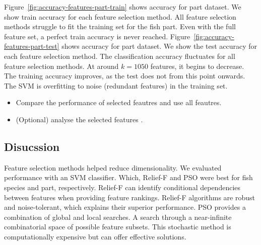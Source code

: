 \documentclass[runningheads]{llncs}
\begin{document}
Figure~\ref{fig:accuracy-features-part-train} shows accuracy for part dataset.
We show train accuracy for each feature selection method.
All feature selection methods struggle to fit the training set for the fish part.
Even with the full feature set, a perfect train accuracy is never reached.
Figure~\ref{fig:accuracy-features-part-test} shows accuracy for part dataset.
We show the test accuracy for each feature selection method.
The classification accuracy fluctuates for all feature selection methods.
At around $k=1050$ features, it begins to decrease.
The training accuracy improves, as the test does not from this point onwards.
The SVM is overfitting to noise (redundant features) in the training set.


\begin{itemize}
  \item Compare the performance of selected feautres and use all feautres. 
  \item (Optional) analyse the selected features .
\end{itemize}


\subsection{Disucssion}
\label{sec:results-feature-selection-discussion}


Feature selection methods helped reduce dimensionality.
We evaluated performance with an SVM classifier.
Which, Relief-F and PSO were best for fish species and part, respectively.
Relief-F can identify conditional dependencies between features when providing feature rankings.
Relief-F algorithms are robust and noise-tolerant, which explains their superior performance.
PSO provides a combination of global and local searches.
A search through a near-infinite combinatorial space of possible feature subsets.
This stochastic method is computationally expensive but can offer effective solutions.
\end{document}

